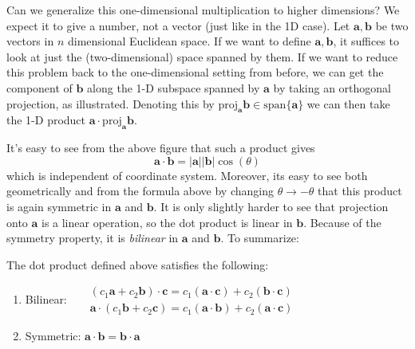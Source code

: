\documentclass[../master.tex]{subfiles}
\begin{document}
	
	Can we generalize this one-dimensional multiplication to higher dimensions? We expect it to give a number, not a vector (just like in the 1D case). Let $\mathbf a, \mathbf b$ be two vectors in $n$ dimensional Euclidean space. If we want to define $\mathbf a, \mathbf b$, it suffices to look at just the (two-dimensional) space spanned by them. If we want to reduce this problem back to the one-dimensional setting from before, we can get the component of $\mathbf b$ along the 1-D subspace spanned by $\mathbf a$ by taking an orthogonal projection, as illustrated. Denoting this by $\mathrm{proj}_{\mathbf a} \mathbf b \in \text{span} \{ \mathbf a\}$ we can then take the 1-D product $\mathbf a \cdot \mathrm{proj}_{\mathbf a} \mathbf b$.
	
	It's easy to see from the above figure that such a product gives
	\begin{equation}
		\mathbf a \cdot \mathbf b = |\mathbf a| |\mathbf b| \cos(\theta)
	\end{equation}
	which is independent of coordinate system. Moreover, its easy to see both geometrically and from the formula above by changing $\theta \to -\theta$ that this product is again symmetric in $\mathbf a$ and $\mathbf b$. It is only slightly harder to see that projection onto $\mathbf a$ is a linear operation, so the dot product is linear in $\mathbf b$. Because of the symmetry property, it is \emph{bilinear} in $\mathbf a$ and $\mathbf b$. To summarize:
	\begin{prop}
		The dot product defined above satisfies the following:
		\begin{enumerate}
			\item Bilinear: ~~ $\begin{matrix}
				(c_1 \mathbf a + c_2 \mathbf b) \cdot \mathbf c = c_1 (\mathbf a \cdot \mathbf c) + c_2 (\mathbf b \cdot \mathbf c)\\
				\mathbf a \cdot (c_1 \mathbf b + c_2 \mathbf c) = c_1 (\mathbf a \cdot \mathbf b) + c_2 (\mathbf a \cdot \mathbf c)
			\end{matrix}$
			\item Symmetric: $\mathbf a \cdot \mathbf b = \mathbf b \cdot \mathbf a$
		\end{enumerate}
	\end{prop}
\end{document}
